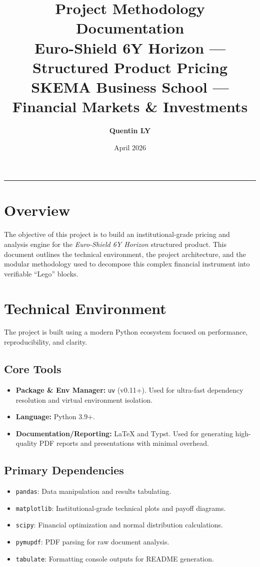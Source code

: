 \documentclass[11pt,a4paper]{article}
\title{
    \vspace{2cm}
    \textbf{\Huge\color{navy}Project Methodology Documentation} \\
    \vspace{1cm}
    {\Large Euro-Shield 6Y Horizon --- Structured Product Pricing} \\
    \vspace{0.5cm}
    {\large SKEMA Business School --- Financial Markets \& Investments}
    \vspace{2cm}
}
\author{\textbf{Quentin LY}}
\date{April 2026}
\begin{document}
\maketitle
\thispagestyle{empty}
\vspace{2cm}
\begin{center}
    \rule{\linewidth}{0.5pt}
\end{center}
\vfill
\newpage

\tableofcontents
\newpage

\section{Overview}
The objective of this project is to build an institutional-grade pricing and analysis engine for the \textit{Euro-Shield 6Y Horizon} structured product. This document outlines the technical environment, the project architecture, and the modular methodology used to decompose this complex financial instrument into verifiable ``Lego'' blocks.

\section{Technical Environment}
The project is built using a modern Python ecosystem focused on performance, reproducibility, and clarity.

\subsection{Core Tools}
\begin{itemize}
    \item \textbf{Package \& Env Manager:} \texttt{uv} (v0.11+). Used for ultra-fast dependency resolution and virtual environment isolation.
    \item \textbf{Language:} Python 3.9+.
    \item \textbf{Documentation/Reporting:} LaTeX and Typst. Used for generating high-quality PDF reports and presentations with minimal overhead.
\end{itemize}

\subsection{Primary Dependencies}
\begin{itemize}
    \item \texttt{pandas}: Data manipulation and results tabulating.
    \item \texttt{matplotlib}: Institutional-grade technical plots and payoff diagrams.
    \item \texttt{scipy}: Financial optimization and normal distribution calculations.
    \item \texttt{pymupdf}: PDF parsing for raw document analysis.
    \item \texttt{tabulate}: Formatting console outputs for README generation.
\end{itemize}
\end{document}
